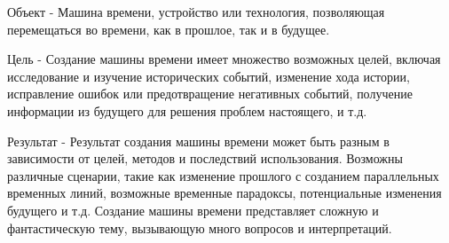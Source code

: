 Объект - Машина времени, устройство или технология, позволяющая перемещаться во времени, как в прошлое, так и в будущее.

Цель - Создание машины времени имеет множество возможных целей, включая исследование и изучение исторических событий, изменение хода истории, исправление ошибок или предотвращение негативных событий, получение информации из будущего для решения проблем настоящего, и т.д.

Результат - Результат создания машины времени может быть разным в зависимости от целей, методов и последствий использования. Возможны различные сценарии, такие как изменение прошлого с созданием параллельных временных линий, возможные временные парадоксы, потенциальные изменения будущего и т.д. Создание машины времени представляет сложную и фантастическую тему, вызывающую много вопросов и интерпретаций.



